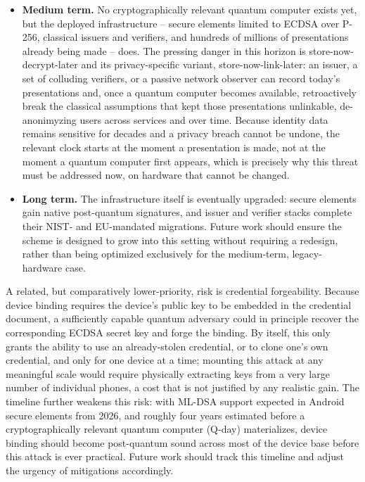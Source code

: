 \documentclass[binding=0.6cm,oneside,noexaminfo]{sapthesis}
\begin{document}
\begin{itemize}
    \item \textbf{Medium term.} No cryptographically relevant quantum computer exists yet, but the deployed infrastructure -- secure elements limited to ECDSA over P-256, classical issuers and verifiers, and hundreds of millions of presentations already being made -- does. The pressing danger in this horizon is store-now-decrypt-later and its privacy-specific variant, store-now-link-later: an issuer, a set of colluding verifiers, or a passive network observer can record today's presentations and, once a quantum computer becomes available, retroactively break the classical assumptions that kept those presentations unlinkable, de-anonimyzing users across services and over time. Because identity data remains sensitive for decades and a privacy breach cannot be undone, the relevant clock starts at the moment a presentation is made, not at the moment a quantum computer first appears, which is precisely why this threat must be addressed now, on hardware that cannot be changed.
    \item \textbf{Long term.} The infrastructure itself is eventually upgraded: secure elements gain native post-quantum signatures, and issuer and verifier stacks complete their NIST- and EU-mandated migrations. Future work should ensure the scheme is designed to grow into this setting without requiring a redesign, rather than being optimized exclusively for the medium-term, legacy-hardware case.
\end{itemize}

A related, but comparatively lower-priority, risk is credential forgeability. Because device binding requires the device's public key to be embedded in the credential document, a sufficiently capable quantum adversary could in principle recover the corresponding ECDSA secret key and forge the binding. By itself, this only grants the ability to use an already-stolen credential, or to clone one's own credential, and only for one device at a time; mounting this attack at any meaningful scale would require physically extracting keys from a very large number of individual phones, a cost that is not justified by any realistic gain. The timeline further weakens this risk: with ML-DSA support expected in Android secure elements from 2026, and roughly four years estimated before a cryptographically relevant quantum computer (Q-day) materializes, device binding should become post-quantum sound across most of the device base before this attack is ever practical. Future work should track this timeline and adjust the urgency of mitigations accordingly.
\end{document}
